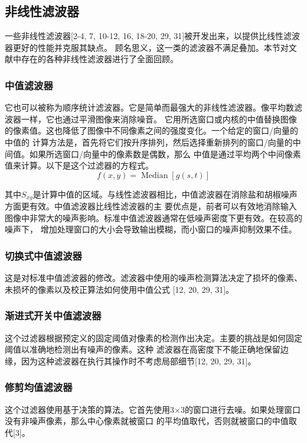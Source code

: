 \documentclass[12pt]{article} %
\begin{document}
\subsection{非线性滤波器}
一些非线性滤波器[2-4, 7, 10-12, 16, 18-20, 29, 31]被开发出来，以提供比线性滤波器更好的性能并克服其缺点。
顾名思义，这一类的滤波器不满足叠加。本节对文献中存在的各种非线性滤波器进行了全面回顾。

\subsubsection{中值滤波器}
它也可以被称为顺序统计滤波器。它是简单而最强大的非线性滤波器。像平均数滤波器一样，它也通过平滑图像来消除噪音。
它用所选窗口或内核的中值替换图像的像素值。这也降低了图像中不同像素之间的强度变化。一个给定的窗口/向量的中值的
计算方法是，首先将它们按升序排列，然后选择重新排列的窗口/向量的中间值。如果所选窗口/向量中的像素数是偶数，那么
中值是通过平均两个中间像素值来计算。以下是这个过滤器的方程式。
\begin{equation}
    f(x, y)=\operatorname{Median}[g(s, t)]
\end{equation}

其中$S_{xy}$是计算中值的区域。与线性滤波器相比，中值滤波器在消除盐和胡椒噪声方面更有效。中值滤波器比线性滤波器的主
要优点是，前者可以有效地消除输入图像中非常大的噪声影响。标准中值滤波器通常在低噪声密度下更有效。在较高的噪声下，
增加处理窗口的大小会导致输出模糊，而小窗口的噪声抑制效果不佳。

\subsubsection{切换式中值滤波器}
这是对标准中值滤波器的修改。滤波器中使用的噪声检测算法决定了损坏的像素、未损坏的像素以及校正算法如何使用中值公式
[12, 20, 29, 31]。

\subsubsection{渐进式开关中值滤波器}
这个过滤器根据预定义的固定阈值对像素的检测作出决定。主要的挑战是如何固定阈值以准确地检测出有噪声的像素。这种
滤波器在高密度下不能正确地保留边缘，因为这种滤波器在执行其操作时不考虑局部细节[12, 20, 29, 31]。

\subsubsection{修剪均值滤波器}
这个过滤器使用基于决策的算法。它首先使用3×3的窗口进行去噪。如果处理窗口没有非噪声像素，那么中心像素就被窗口
的平均值取代，否则就被窗口的中值取代[3]。
\end{document}
